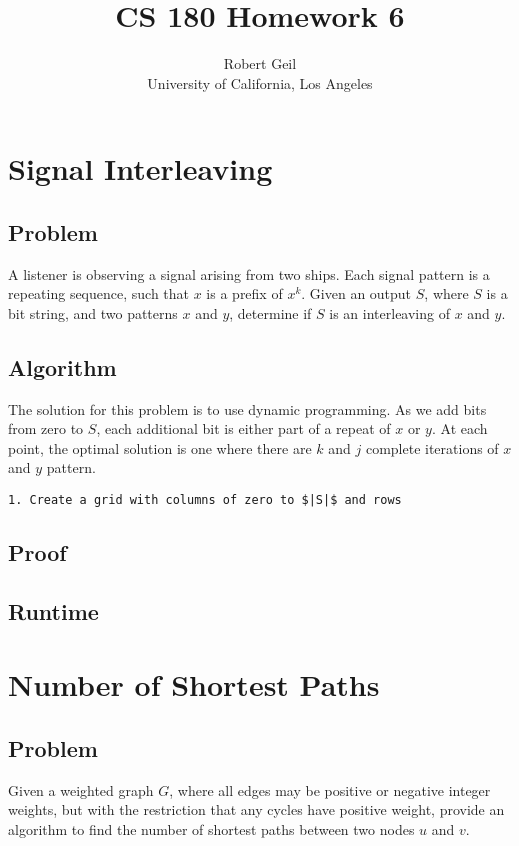 \documentclass[titlepage]{article}
\title{CS 180 Homework 6}
\author{Robert Geil \\
University of California, Los Angeles
}
\begin{document}
\maketitle
\section{Signal Interleaving}
\subsection{Problem}
A listener is observing a signal arising from two ships. Each signal pattern is a repeating sequence, such that $x$ is a prefix of $x^k$.
Given an output $S$, where $S$ is a bit string, and two patterns $x$ and $y$, determine if $S$ is an interleaving of $x$ and $y$.
\subsection{Algorithm}
The solution for this problem is to use dynamic programming. As we add bits from zero to $S$, each additional bit is either part of a repeat
of $x$ or $y$. At each point, the optimal solution is one where there are $k$ and $j$ complete iterations of $x$ and $y$ pattern. 
\begin{lstlisting}
1. Create a grid with columns of zero to $|S|$ and rows
\end{lstlisting}
\subsection{Proof}
\subsection{Runtime}
\section{Number of Shortest Paths}
\subsection{Problem}
Given a weighted graph $G$, where all edges may be positive or negative integer weights, but with the restriction that any cycles have
positive weight, provide an algorithm to find the number of shortest paths between two nodes $u$ and $v$.
\end{document}
